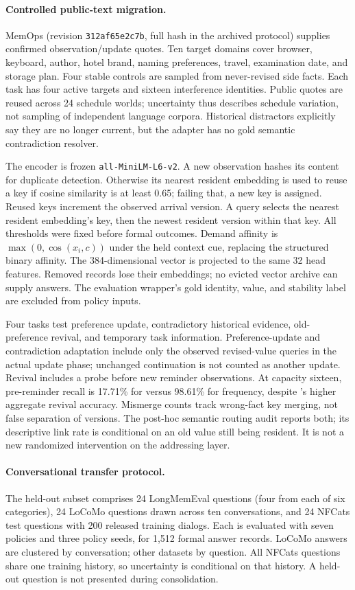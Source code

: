 \paragraph{Controlled public-text migration.}
MemOps (revision \texttt{312af65e2c7b}, full hash in the archived protocol) supplies confirmed observation/update quotes. Ten target domains cover browser, keyboard, author, hotel brand, naming preferences, travel, examination date, and storage plan. Four stable controls are sampled from never-revised side facts. Each task has four active targets and sixteen interference identities. Public quotes are reused across 24 schedule worlds; uncertainty thus describes schedule variation, not sampling of independent language corpora. Historical distractors explicitly say they are no longer current, but the adapter has no gold semantic contradiction resolver.

The encoder is frozen \texttt{all-MiniLM-L6-v2}. A new observation hashes its content for duplicate detection. Otherwise its nearest resident embedding is used to reuse a key if cosine similarity is at least 0.65; failing that, a new key is assigned. Reused keys increment the observed arrival version. A query selects the nearest resident embedding's key, then the newest resident version within that key. All thresholds were fixed before formal outcomes. Demand affinity is $\max(0,\cos(x_i,c))$ under the held context cue, replacing the structured binary affinity. The 384-dimensional vector is projected to the same 32 head features. Removed records lose their embeddings; no evicted vector archive can supply answers. The evaluation wrapper's gold identity, value, and stability label are excluded from policy inputs.

Four tasks test preference update, contradictory historical evidence, old-preference revival, and temporary task information. Preference-update and contradiction adaptation include only the observed revised-value queries in the actual update phase; unchanged continuation is not counted as another update. Revival includes a probe before new reminder observations. At capacity sixteen, pre-reminder recall is 17.71\% for \ame versus 98.61\% for frequency, despite \ame's higher aggregate revival accuracy. Mismerge counts track wrong-fact key merging, not false separation of versions. The post-hoc semantic routing audit reports both; its descriptive link rate is conditional on an old value still being resident. It is not a new randomized intervention on the addressing layer.

\paragraph{Conversational transfer protocol.}
The held-out subset comprises 24 LongMemEval questions (four from each of six categories), 24 LoCoMo questions drawn across ten conversations, and 24 NFCats test questions with 200 released training dialogs. Each is evaluated with seven policies and three policy seeds, for 1,512 formal answer records. LoCoMo answers are clustered by conversation; other datasets by question. All NFCats questions share one training history, so uncertainty is conditional on that history. A held-out question is not presented during consolidation.

